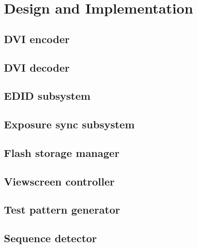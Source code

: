 \chapter{Design and Implementation}






\section{DVI encoder}


\section{DVI decoder}
\section{EDID subsystem}
\section{Exposure sync subsystem}
\section{Flash storage manager}
\section{Viewscreen controller}
\section{Test pattern generator}
\section{Sequence detector}